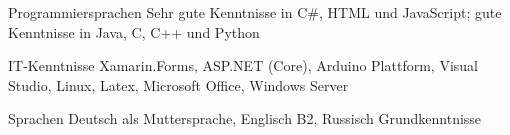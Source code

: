 


\begin{cvskills}


\cvskill
{Programmiersprachen} %
{Sehr gute Kenntnisse in C\#, HTML und JavaScript; gute Kenntnisse in Java, C, C++ und Python} %


\cvskill
{IT-Kenntnisse} %
{Xamarin.Forms, ASP.NET (Core), Arduino Plattform, Visual Studio, Linux, Latex, Microsoft Office, Windows Server} %


\cvskill
{Sprachen} %
{Deutsch als Muttersprache, Englisch B2, Russisch Grundkenntnisse} %


\end{cvskills}